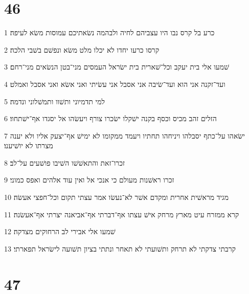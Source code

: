 \chapter{46}

\par 1 כרע בל קרס נבו היו עצביהם לחיה ולבהמה נשׂאתיכם עמוסות משׂא לעיפה׃
\par 2 קרסו כרעו יחדו לא יכלו מלט משׂא ונפשׁם בשׁבי הלכה׃
\par 3 שׁמעו אלי בית יעקב וכל־שׁארית בית ישׂראל העמסים מני־בטן הנשׂאים מני־רחם׃
\par 4 ועד־זקנה אני הוא ועד־שׂיבה אני אסבל אני עשׂיתי ואני אשׂא ואני אסבל ואמלט׃
\par 5 למי תדמיוני ותשׁוו ותמשׁלוני ונדמה׃
\par 6 הזלים זהב מכיס וכסף בקנה ישׁקלו ישׂכרו צורף ויעשׂהו אל יסגדו אף־ישׁתחוו׃
\par 7 ישׂאהו על־כתף יסבלהו ויניחהו תחתיו ויעמד ממקומו לא ימישׁ אף־יצעק אליו ולא יענה מצרתו לא יושׁיענו׃
\par 8 זכרו־זאת והתאשׁשׁו השׁיבו פושׁעים על־לב׃
\par 9 זכרו ראשׁנות מעולם כי אנכי אל ואין עוד אלהים ואפס כמוני׃
\par 10 מגיד מראשׁית אחרית ומקדם אשׁר לא־נעשׂו אמר עצתי תקום וכל־חפצי אעשׂה׃
\par 11 קרא ממזרח עיט מארץ מרחק אישׁ עצתו אף־דברתי אף־אביאנה יצרתי אף־אעשׂנה׃
\par 12 שׁמעו אלי אבירי לב הרחוקים מצדקה׃
\par 13 קרבתי צדקתי לא תרחק ותשׁועתי לא תאחר ונתתי בציון תשׁועה לישׂראל תפארתי׃

\chapter{47}

